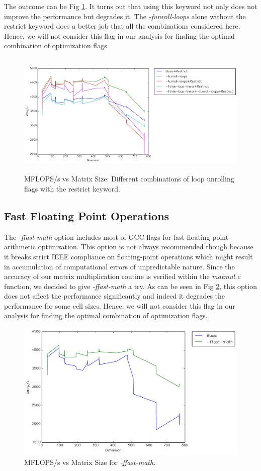 \documentclass{article}
\begin{document}
The outcome can be Fig \ref{fig:restrict}. It turns out that using this keyword not only does not improve the performance but degrades it. The \textit{-funroll-loops} alone without the restrict keyword does a better job that all the combinations considered here. Hence, we will not consider this flag in our analysis for finding the optimal combination of optimization flags.


    \begin{figure}[h]
    \centering
    \includegraphics[width=14cm,height=6cm]{timing-loops-restrict.pdf}
    \caption{MFLOPS/s vs Matrix Size: Different combinations of loop unrolling flags with the restrict keyword.}
    \label{fig:restrict}
  \end{figure}

\subsection{Fast Floating Point Operations}

The \textit{-ffast-math} option includes most of GCC flags for fast floating point arithmetic optimization.  This option is not always recommended though because it breaks strict IEEE compliance on floating-point operations which might result in accumulation of computational errors of unpredictable nature. Since the accuracy of our matrix multiplication routine is verified within the \textit{ matmul.c} function, we decided to give \textit{-ffast-math} a try. As can be seen in Fig \ref{fig:timing-math}, this option does not affect the performance significantly and indeed it degrades the performance for some cell sizes. Hence, we will not consider this flag in our analysis for finding the optimal combination of optimization flags.
 

  \begin{figure}[h]
    \centering
    \includegraphics[width=.7\textwidth]{timing-math.pdf}
    \caption{MFLOPS/s vs Matrix Size for \textit{-ffast-math}.}
    \label{fig:timing-math}
  \end{figure}
\end{document}
